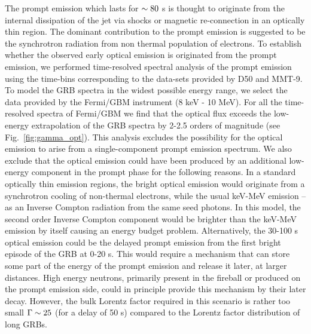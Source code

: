 \documentclass{naturesubmissionstyle}
\begin{document}
The prompt emission which lasts for $\rm \sim 80$ s is thought to originate from the internal dissipation of the jet via shocks\cite{Narayan1992,Rees1994} or magnetic re-connection\cite{Drenkhahn2002,Lyutikov2003,Zhang2011} in an optically thin region. The dominant contribution to the prompt emission is suggested to be the synchrotron radiation from non thermal population of electrons\cite{Rees1994,Sari1996}. 
To establish whether the observed early optical emission is originated from the prompt emission, we 
performed time-resolved spectral analysis of the prompt emission %
using the time-bins corresponding to the data-sets provided by D50 and MMT-9. To model the GRB spectra in the widest possible energy range, we select the data provided by the Fermi/GBM instrument (8 keV - 10 MeV). For all the time-resolved spectra of Fermi/GBM we find that the optical flux exceeds the low-energy extrapolation of the GRB spectra by 2-2.5 orders of magnitude (see Fig.~\ref{fig:gamma_opt}). This analysis excludes the possibility for the optical emission to arise from a single-component prompt emission spectrum\cite{Oganesyan2019}. We also exclude that the optical emission could have been produced by an additional low-energy component in the prompt phase for the following reasons. In a standard optically thin emission regions, the bright optical emission would originate from a synchrotron cooling of non-thermal electrons, while the usual keV-MeV emission -- as an Inverse Compton radiation from the same seed photons. In this model, the second order Inverse Compton component would be brighter than the keV-MeV emission by itself causing an energy budget problem\cite{Derishev2001,Piran2009}. Alternatively, the 30-100 s optical emission could be the delayed prompt emission from the first bright episode of the GRB at 0-20 s. This would require a mechanism that can store some part of the energy of the prompt emission and release it later, at larger distances. High energy neutrons, primarily present in the fireball\cite{Derishev1999,Fuller2000,Beloborodov2003} or produced on the prompt emission side, could in principle provide this mechanism by their later decay. However, the bulk Lorentz factor required in this scenario is rather too small $\rm \Gamma \sim 25 $\cite{Fan2009} (for a delay of 50 s) compared to the Lorentz factor distribution of long GRBs\cite{Ghirlanda2018}. 
\end{document}
